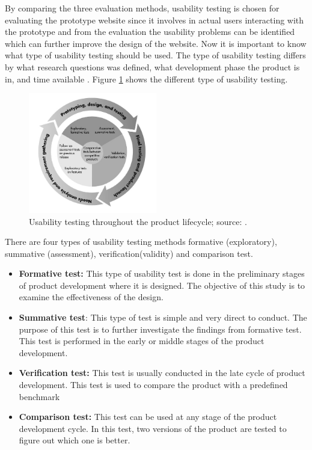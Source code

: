 \documentclass[mscthesis]{usiinfthesis}
\begin{document}
By comparing the three evaluation methods, usability testing is chosen for evaluating the prototype website since it involves in actual users interacting with the prototype and from the evaluation the usability problems can be identified which can further improve the design of the website. Now it is important to know what type of usability testing should be used. The type of usability testing differs by what research questions was defined, what development phase the product is in, and time available \cite{rubin_handbook_2008}. Figure \ref{fig4} shows the different type of usability testing.

\begin{figure}[!ht]
  \centering
  \includegraphics[width=0.5\textwidth]{cycle}
  \caption{Usability testing throughout the product lifecycle; source: \cite{rubin_handbook_2008}.}
  \label{fig4}
\end{figure}

There are four types of usability testing methods formative (exploratory), summative (assessment), verification(validity) and comparison test.

\begin{itemize}
\item \textbf{Formative test:} This type of usability test is done in the preliminary stages of product development where it is designed. The objective of this study is to examine the effectiveness of the design.
\item \textbf{Summative test}: This type of test is simple and very direct to conduct. The purpose of this test is to further investigate the findings from formative test. This test is performed in the early or middle stages of the product development.
\item \textbf{Verification test:} This test is usually conducted in the late cycle of product development. This test is used to compare the product with a predefined benchmark 
\item \textbf{Comparison test:} This test can be used at any stage of the product development cycle. In this test, two versions of the product are tested to figure out which one is better. 
\end{itemize}
\end{document}
